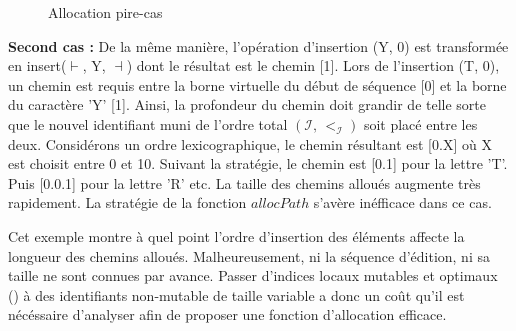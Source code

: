 \begin{wrapfigure}{r}{0.5\textwidth}
  \vspace{-10pt}
  \centering
  
  \caption{\label{repl:fig:allocpathexampleB}Allocation pire-cas}
  \vspace{-10pt}
\end{wrapfigure}

\textbf{Second cas :} De la même manière, l'opération d'insertion (Y, 0) est
transformée en insert($\vdash$, Y, $\dashv$) dont le résultat est le chemin
[1]. Lors de l'insertion (T, 0), un chemin est requis entre la borne virtuelle
du début de séquence [0] et la borne du caractère 'Y' [1]. Ainsi, la profondeur
du chemin doit grandir de telle sorte que le nouvel identifiant muni de l'ordre
total $(\mathcal{I},\,<_\mathcal{I})$ soit placé entre les deux. Considérons un
ordre lexicographique, le chemin résultant est [0.X] où X est choisit entre 0 et
10. Suivant la stratégie, le chemin est [0.1] pour la lettre 'T'. Puis [0.0.1]
pour la lettre 'R' etc. La taille des chemins alloués augmente très rapidement.
La stratégie de la fonction $allocPath$ s'avère inéfficace dans ce cas.

Cet exemple montre à quel point l'ordre d'insertion des éléments affecte la
longueur des chemins alloués. Malheureusement, ni la séquence d'édition, ni sa
taille ne sont connues par avance.  Passer d'indices locaux mutables et optimaux
() à des identifiants non-mutable de taille variable a
donc un coût qu'il est nécéssaire d'analyser afin de proposer une fonction
d'allocation efficace.



